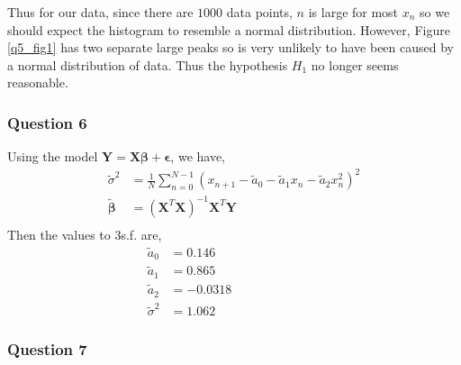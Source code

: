 \documentclass[12pt, a4paper]{article}
\begin{document}
Thus for our data, since there are $1000$ data points, $n$ is large for most $x_{n}$ so we should expect the histogram to resemble a normal distribution. However, Figure \ref{q5_fig1} has two separate large peaks so is very unlikely to have been caused by a normal distribution of data. Thus the hypothesis $H_{1}$ no longer seems reasonable.


\subsubsection*{Question 6}

Using the model $\bm{Y} = \bm{X\beta} + \bm{\epsilon}$, we have,
\begin{align*}
	\tilde{\sigma}^{2} & = \frac{1}{N} \sum_{n = 0}^{N-1}(x_{n+1} - \tilde{a}_{0} - \tilde{a}_{1}x_{n} - \tilde{a}_{2}x_{n}^{2})^{2} \\
	\bm{\tilde{\beta}} & = (\bm{X}^{T}\bm{X})^{-1}\bm{X}^{T}\bm{Y} \\
\end{align*} 
Then the values to 3s.f. are,
\begin{align*}
	\tilde{a}_{0} & = 0.146 ~~~~ \\
	\tilde{a}_{1} & = 0.865 ~~~~ \\
	\tilde{a}_{2} & = -0.0318 ~~~~~~~~~~~~~~~~~~~~~~~~~~~~~~~~ \\
	\tilde{\sigma}^{2} & = 1.062
\end{align*}

\subsubsection*{Question 7}
\end{document}
